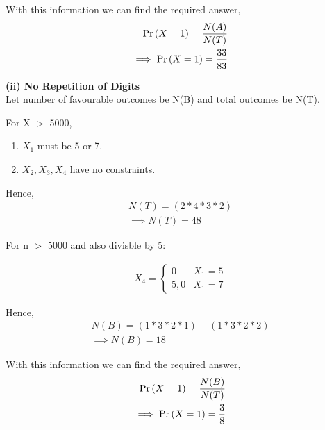 \documentclass{article}
\begin{document}
With this information we can find the required answer,
\begin{align}
	\Pr\left(X=1\right)=\frac{N(A)}{N(T)}\\
	\implies \Pr\left(X=1\right)=\frac{33}{83}
\end{align}



\textbf{(ii) No Repetition of Digits}\\
Let number of favourable outcomes be N(B) and total outcomes be N(T).

For X $>$ 5000,

\begin{enumerate}
	\item $X_{1}$ must be 5 or 7.\\
	\item $X_{2},X_{3},X_{4}$ have no constraints.
\end{enumerate}

Hence,
\begin{align}
	N(T)=(2*4*3*2) \\
	\implies N(T)=48
\end{align}

For n $>$ 5000 and also divisble by 5:

\begin{align}
	X_{4} = \begin{cases}
		0 & X_{1}=5 \\
		5,0 & X_{1}=7
	\end{cases}
\end{align}

Hence,
\begin{align}
	N(B)=(1*3*2*1)+(1*3*2*2) \\
	\implies N(B)=18
\end{align}

With this information we can find the required answer,
\begin{align}
	\Pr\left(X=1\right)=\frac{N(B)}{N(T)}\\
	\implies \Pr\left(X=1\right)=\frac{3}{8}
\end{align}
\end{document}
